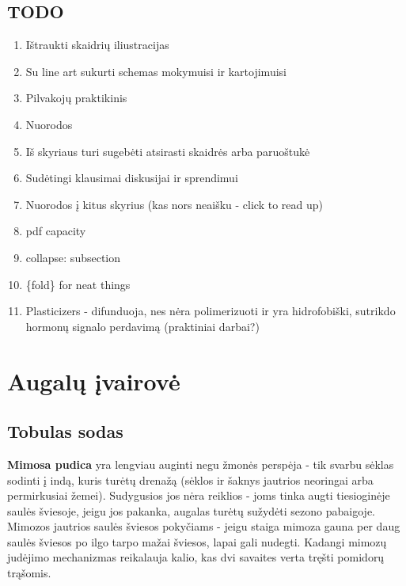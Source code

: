 \documentclass[]{book}
\providecommand{\tightlist}{%
  \setlength{\itemsep}{0pt}\setlength{\parskip}{0pt}}
\begin{document}
\hypertarget{todo}{%
\section{TODO}\label{todo}}

\begin{enumerate}
\def\labelenumi{\arabic{enumi}.}
\tightlist
\item
  Ištraukti skaidrių iliustracijas
\item
  Su line art sukurti schemas mokymuisi ir kartojimuisi
\item
  Pilvakojų praktikinis
\item
  Nuorodos
\item
  Iš skyriaus turi sugebėti atsirasti skaidrės arba paruoštukė
\item
  Sudėtingi klausimai diskusijai ir sprendimui
\item
  Nuorodos į kitus skyrius (kas nors neaišku - click to read up)
\item
  pdf capacity
\item
  collapse: subsection
\item
  \{fold\} for neat things
\item
  Plasticizers - difunduoja, nes nėra polimerizuoti ir yra hidrofobiški, sutrikdo hormonų signalo perdavimą (praktiniai darbai?)
\end{enumerate}

\hypertarget{augalu-ivairove}{%
\chapter{Augalų įvairovė}\label{augalu-ivairove}}

\hypertarget{tobulas-sodas}{%
\section{Tobulas sodas}\label{tobulas-sodas}}

\textbf{Mimosa pudica} yra lengviau auginti negu žmonės perspėja - tik svarbu sėklas sodinti į indą, kuris turėtų drenažą (sėklos ir šaknys jautrios neoringai arba permirkusiai žemei). Sudygusios jos nėra reiklios - joms tinka augti tiesioginėje saulės šviesoje, jeigu jos pakanka, augalas turėtų sužydėti sezono pabaigoje. Mimozos jautrios saulės šviesos pokyčiams - jeigu staiga mimoza gauna per daug saulės šviesos po ilgo tarpo mažai šviesos, lapai gali nudegti. Kadangi mimozų judėjimo mechanizmas reikalauja kalio, kas dvi savaites verta tręšti pomidorų trąšomis.
\end{document}
